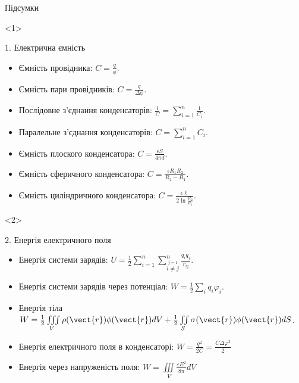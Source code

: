 \documentclass[onlytextwidth]{beamer}
\begin{document}
\begin{frame}{Підсумки}{}\small
\begin{onlyenv}<1>
\begin{block}{1. Електрична ємність}
        \begin{itemize}
            \item Ємність провідника: $ C = \frac{q}{\phi} $.
            \item Ємність пари провідників: $ C = \frac{q}{\Delta\phi} $.
            \item Послідовне з'єднання конденсаторів: $\frac1C = \sum\limits_{i = 1}^n\frac1{C_i}$.
            \item Паралельне з'єднання конденсаторів: $C = \sum\limits_{i = 1}^n{C_i}$.
            \item Ємність плоского конденсатора: $ C = \frac{\epsilon S}{4\pi d} $.
            \item Ємність сферичного конденсатора: $ C = \frac{\epsilon R_1 R_2}{R_2 - R_1} $.
            \item Ємність циліндричного конденсатора: $ C = \frac{\epsilon \ell}{2 \ln
            \frac{R_2}{R_1}} $.
        \end{itemize}
    \end{block}
\end{onlyenv}
\begin{onlyenv}<2>
    \begin{block}{2. Енергія електричного поля}
        \begin{itemize}
            \item Енергія системи зарядів: $
            			U = \frac12\sum\limits_{i = 1}^n\sum\limits_{\stackrel{j = 1}{i \neq j}}^n
            			\frac{q_iq_j}{r_{ij}}
            		$.
            \item Енергія системи зарядів через потенціал: $ W = \frac{1}{2} \sum_{i} q_i \varphi_i
            $.
            \item Енергія тіла $ W = \frac12 \iiint\limits_V \rho(\vect{r})\phi(\vect{r}) dV +
            \frac12
				\iint\limits_S
				\sigma(\vect{r})\phi(\vect{r}) dS $.
            \item Енергія електричного поля в конденсаторі: $ W = \frac{q^2}{2C} = \frac{C \Delta
            \varphi^2}{2} $
            \item Енергія через напруженість поля: $ W = \iiint\limits_V\frac{\varepsilon
            E^2}{8\pi} dV $
        \end{itemize}

\end{block}
\end{onlyenv}
\end{frame}
\end{document}
